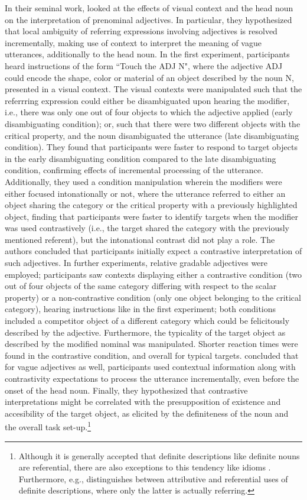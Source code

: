 In their seminal work, \textcite{sedivy1999} looked at the effects of visual context and the head noun on the interpretation of prenominal adjectives. In particular, they hypothesized that local ambiguity of referring expressions involving adjectives is resolved incrementally, making use of context to interpret the meaning of vague utterances, additionally to the head noun. 
In the first experiment, participants heard instructions of the form ``Touch the ADJ N", where the adjective ADJ could encode the shape, color or material of an object described by the noun N, presented in a visual context. The visual contexts were manipulated such that the referrring expression could either be disambiguated upon hearing the modifier, i.e., there was only one out of four objects to which the adjective applied (early disambiguating condition); or, such that there were two different objects with the critical property, and the noun disambiguated the utterance (late disambiguating condition). 
They found that participants were faster to respond to target objects in the early disambiguating condition compared to the late disambiguating condition, confirming effects of incremental processing of the utterance. 
 Additionally, they used a condition manipulation wherein the modifiers were either focused intonationally or not, where the utterance referred to either an object sharing the category or the critical property with a previously highlighted object, finding that participants were faster to identify targets when the modifier was used contrastively (i.e., the target shared the category with the previously mentioned referent), but the intonational contrast  did not play a role. The authors concluded that participants initially expect a contrastive interpretation of such adjectives. 
 In further experiments, relative gradable adjectives were employed; participants saw contexts displaying either a contrastive condition (two out of four objects of the same category differing with respect to the scalar property) or a non-contrastive condition (only one object belonging to the critical category), hearing instructions like in the first experiment; both conditions included a competitor object of a different category which could be felicitously described by the adjective. Furthermore, the typicality of the target object as described by the modified nominal was manipulated. Shorter reaction times were found in the contrastive condition, and overall for typical targets. \textcite{sedivy1999} concluded that for vague adjectives as well, participants used contextual information along with contrastivity expectations to process the utterance incrementally, even before the onset of the head noun. Finally, they hypothesized that contrastive interpretations might be correlated with the presupposition of existence and accesibility of the target object, as elicited by the definiteness of the noun and the overall task set-up.\footnote{Although it is generally accepted that definite descriptions like definite nouns are referential, there are also exceptions to this tendency like idioms \parencite{Reboul2001}. Furthermore, e.g., \textcite{donnellan1966reference} distinguishes between attributive and referential uses of definite descriptions, where only the latter is actually referring.} 
